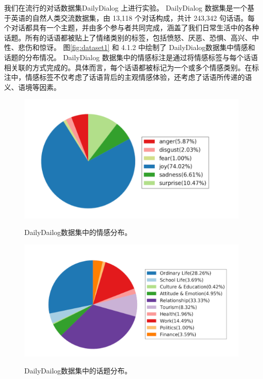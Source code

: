 



我们在流行的对话数据集DailyDialog \cite{li2017dailydialog}上进行实验。
DailyDialog 数据集是一个基于英语的自然人类交流数据集，由 13,118 个对话构成，共计 243,342 句话语。每个对话都具有一个主题，并由多个参与者共同完成，涵盖了我们日常生活中的各种话题。所有的话语都被贴上了情绪类别的标签，包括愤怒、厌恶、恐惧、高兴、中性、悲伤和惊讶。 图\ref{fig:dataset1} 和
4.1.2
中绘制了 DailyDialog数据集中情感和话题的分布情况。
DailyDialog 数据集中的情感标注是通过将情感标签与每个话语相关联的方式完成的。具体而言，每个话语都被标记为一个或多个情感类别。在标注中，情感标签不仅考虑了话语背后的主观情感体验，还考虑了话语所传递的语义、语境等因素。


\begin{figure}[ht] \label{decom}
    \vspace{15pt}

    \centering
 \hspace{-0.2cm}
 {
    \begin{minipage}{0.48\linewidth}
    \centering  %
    \includegraphics[width=\linewidth]{figures/dataset1.png}
    \label{fig:dataset1}
    \caption{DailyDailog数据集中的情感分布。}
    \end{minipage}}
 {
    \begin{minipage}{0.48\linewidth}
    \centering  %
    \includegraphics[width=\linewidth]{figures/dataset2.png}
    \label{fig:dataset2}
    \caption{DailyDailog数据集中的话题分布。}
    \end{minipage}}
    \vspace{10pt}
\end{figure}
    


